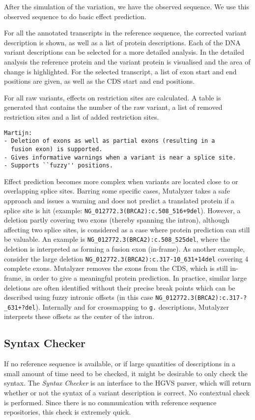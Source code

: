 \documentclass{article}
\begin{document}
After the simulation of the variation, we have the observed sequence. We use
this observed sequence to do basic effect prediction.

For all the annotated transcripts in the reference sequence, the corrected
variant description is shown, as well as a list of protein descriptions. Each
of the DNA variant descriptions can be selected for a more detailed analysis.
In the detailed analysis the reference protein and the variant protein is
visualised and the area of change is highlighted. For the selected transcript,
a list of exon start and end positions are given, as well as the CDS start and
end positions.

For all raw variants, effects on restriction sites are calculated. A table is
generated that contains the number of the raw variant, a list of removed
restriction sites and a list of added restriction sites.

\begin{verbatim}
Martijn:
- Deletion of exons as well as partial exons (resulting in a
  fusion exon) is supported.
- Gives informative warnings when a variant is near a splice site.
- Supports ``fuzzy'' positions.
\end{verbatim}

Effect prediction becomes more complex when variants are located close to or
overlapping splice sites.
Barring some specific cases, Mutalyzer takes a safe approach and issues a
warning and does not predict a translated protein if a splice site is hit
(example: \texttt{NG\_012772.3(BRCA2):c.508\_516+9del}).
However, a deletion partly covering two exons (thereby spanning the intron),
although affecting two splice sites, is considered as a case where protein
prediction can still be valuable.
An example is \texttt{NG\_012772.3(BRCA2):c.508\_525del}, where the deletion
is interpreted as forming a fusion exon (in-frame).
As another example, consider the large deletion
\texttt{NG\_012772.3(BRCA2):c.317-10\_631+14del} covering 4 complete exons.
Mutalyzer removes the exons from the CDS, which is still in-frame, in order to
give a meaningful protein prediction.
In practice, similar large deletions are often identified without their
precise break points which can be described using fuzzy intronic offsets (in
this case \texttt{NG\_012772.3(BRCA2):c.317-?\_631+?del}).
Internally and for crossmapping to \texttt{g.} descriptions, Mutalyzer
interprets these offsets as the center of the intron.

\subsection{Syntax Checker} \label{subsec:syntaxcheck}
If no reference sequence is available, or if large quantities of
descriptions in a small amount of time need to be checked, it might be
desirable to only check the syntax. The \emph{Syntax Checker} is an interface
to the HGVS parser, which will return whether or not the syntax of a variant
description is correct. No contextual check is performed. Since there is no
communication with reference sequence repositories, this check is extremely
quick.
\end{document}

